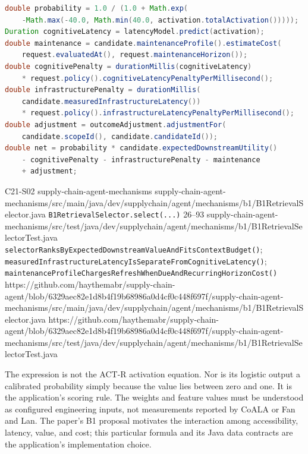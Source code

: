 \begin{minipage}{\linewidth}
\begin{minipage}{\linewidth}
\begin{lstlisting}[language=Java,caption={The selector's net-utility calculation.},label={lst:ch21-b1-net-score}]
double probability = 1.0 / (1.0 + Math.exp(
    -Math.max(-40.0, Math.min(40.0, activation.totalActivation()))));
Duration cognitiveLatency = latencyModel.predict(activation);
double maintenance = candidate.maintenanceProfile().estimateCost(
    request.evaluatedAt(), request.maintenanceHorizon());
double cognitivePenalty = durationMillis(cognitiveLatency)
    * request.policy().cognitiveLatencyPenaltyPerMillisecond();
double infrastructurePenalty = durationMillis(
    candidate.measuredInfrastructureLatency())
    * request.policy().infrastructureLatencyPenaltyPerMillisecond();
double adjustment = outcomeAdjustment.adjustmentFor(
    candidate.scopeId(), candidate.candidateId());
double net = probability * candidate.expectedDownstreamUtility()
    - cognitivePenalty - infrastructurePenalty - maintenance
    + adjustment;
\end{lstlisting}
\end{minipage}

\BookSourceReferenceQR
  {C21-S02}
  {supply-chain-agent-mechanisms}
  {supply-chain-agent-mechanisms/src/main/java/dev/supplychain/agent/mechanisms/b1/B1RetrievalSelector.java}
  {\texttt{B1RetrievalSelector.select(...)}}
  {26--93}
  {supply-chain-agent-mechanisms/src/test/java/dev/supplychain/agent/mechanisms/b1/B1RetrievalSelectorTest.java}
  {\texttt{selectorRanksByExpectedDownstreamValueAndFitsContextBudget()}; \texttt{measuredInfrastructureLatencyIsSeparateFromCognitiveLatency()}; \texttt{maintenanceProfileChargesRefreshWhenDueAndRecurringHorizonCost()}}
  {https://github.com/haythemabr/supply-chain-agent/blob/6329aec82e1d8b4f19b68986a0d4cf0c448f697f/supply-chain-agent-mechanisms/src/main/java/dev/supplychain/agent/mechanisms/b1/B1RetrievalSelector.java}
  {https://github.com/haythemabr/supply-chain-agent/blob/6329aec82e1d8b4f19b68986a0d4cf0c448f697f/supply-chain-agent-mechanisms/src/test/java/dev/supplychain/agent/mechanisms/b1/B1RetrievalSelectorTest.java}
\end{minipage}

The expression is not the ACT-R activation equation. Nor is its logistic output a calibrated probability simply because the value lies between zero and one. It is the application's scoring rule. The weights and feature values must be understood as configured engineering inputs, not measurements reported by CoALA or Fan and Lan. The paper's B1 proposal motivates the interaction among accessibility, latency, value, and cost; this particular formula and its Java data contracts are the application's implementation choice.


